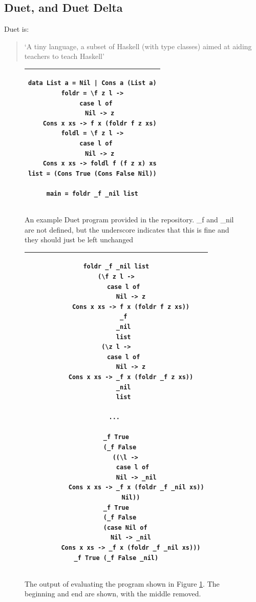 \subsection{Duet, and Duet Delta}
\label{bg:duet}
Duet is:

\begin{quotation}
`A tiny language, a subset of Haskell (with type classes) aimed at aiding teachers to teach Haskell'~\cite{duet_hackage}
\end{quotation}

\begin{figure}[h]
    \centering
    \begin{tabular}{c}
    \hline
    \begin{lstlisting}[language=SFL_noprelude_numbers]
data List a = Nil | Cons a (List a)
foldr = \f z l ->
  case l of
    Nil -> z
    Cons x xs -> f x (foldr f z xs)
foldl = \f z l ->
  case l of
    Nil -> z
    Cons x xs -> foldl f (f z x) xs
list = (Cons True (Cons False Nil))

main = foldr _f _nil list
\end{lstlisting}\\ \hline

    \end{tabular}
    \caption{An example Duet program provided in the repository. \_f and \_nil are not defined, but the underscore indicates that this is fine and they should just be left unchanged}
    \label{bg:duet_foldr}
\end{figure}

\begin{figure}[h]
    \centering
    \begin{tabular}{c}
    \hline
    \begin{lstlisting}[language=SFL_noprelude_numbers]
foldr _f _nil list
(\f z l ->
    case l of
        Nil -> z
        Cons x xs -> f x (foldr f z xs))
    _f
    _nil
    list
(\z l ->
    case l of
        Nil -> z
        Cons x xs -> _f x (foldr _f z xs))
    _nil
    list

... 

_f True
  (_f False
     ((\l ->
         case l of
           Nil -> _nil
           Cons x xs -> _f x (foldr _f _nil xs))
        Nil))
_f True
  (_f False
     (case Nil of
        Nil -> _nil
        Cons x xs -> _f x (foldr _f _nil xs)))
_f True (_f False _nil)
\end{lstlisting}\\ \hline

    \end{tabular}
    \caption{The output of evaluating the program shown in Figure \ref{bg:duet_foldr}. The beginning and end are shown, with the middle removed. }
    \label{bg:duet_foldr_eval}
\end{figure}

